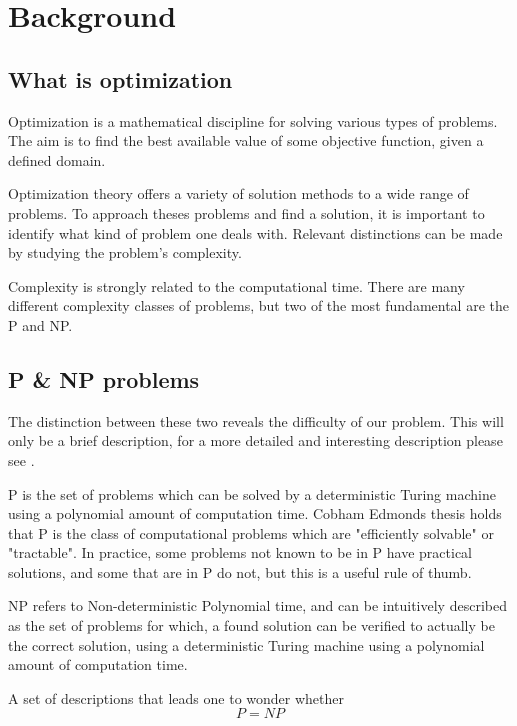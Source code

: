 \section{Background}

\subsection{What is optimization}

Optimization is a mathematical discipline for solving various types of problems. The aim is to find the best available value of some objective function, given a defined domain.

Optimization theory offers a variety of solution methods to a wide range of problems. To approach theses problems and find a solution, it is important to identify what kind of problem one deals with.
Relevant distinctions can be made by studying the problem's complexity.

Complexity is strongly related to the computational time. There are many different complexity classes of problems, but two of the most fundamental are the P and NP.

\subsection{P \& NP problems}

The distinction between these two reveals the difficulty of our problem. This will only be a brief description, for a more detailed and interesting description please see \cite{NP}.

P is the set of problems which can be solved by a deterministic Turing machine using a polynomial amount of computation time.
Cobham Edmonds thesis holds that P is the class of computational problems which are "efficiently solvable" or "tractable". In practice, some problems not known to be in P have practical solutions, and some that are in P do not, but this is a useful rule of thumb.

NP refers to Non-deterministic Polynomial time, and can be intuitively described as the set of problems for which, a found solution can be verified to actually be the correct solution, using a deterministic Turing machine using a polynomial amount of computation time.

A set of descriptions that leads one to wonder whether
\begin{equation}
P = NP
\end{equation}

